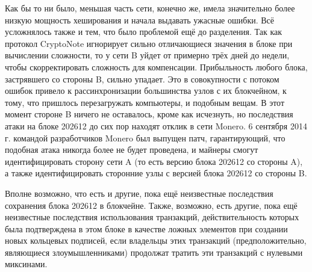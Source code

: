 \documentclass{mrl}
\begin{document}
Как бы то ни было, меньшая часть сети, конечно же, имела значительно более низкую мощность хеширования и начала выдавать ужасные ошибки. Всё усложнялось также и тем, что было проблемой ещё до разделения. Так как протокол CryptoNote игнорирует сильно отличающиеся значения в блоке при вычислении сложности, то у сети B уйдет от примерно трёх дней до недели, чтобы скорректировать сложность для компенсации. Прибыльность любого блока, застрявшего со стороны B, сильно упадает. Это в совокупности с потоком ошибок привело к рассинхронизации большинства узлов с их блокчейном, к тому, что пришлось перезагружать компьютеры, и подобным вещам. В этот момент стороне B ничего не оставалось, кроме как исчезнуть, но последствия атаки на блоке 202612 до сих пор находят отклик в сети Monero. 6 сентября 2014 г. командой разработчиков Monero был выпущен патч, гарантирующий, что подобная атака никогда более не будет проведена, и майнеры смогут идентифицировать сторону сети A (то есть версию блока 202612 со стороны A), а также идентифицировать сторонние узлы с версией блока 202612 со стороны B.

Вполне возможно, что есть и другие, пока ещё неизвестные последствия сохранения блока 202612 в блокчейне. Также, возможно, есть другие, пока ещё неизвестные последствия использования транзакций, действительность которых была подтверждена в этом блоке в качестве ложных элементов при создании новых кольцевых подписей, если владельцы этих транзакций (предположительно, являющиеся злоумышленниками) продолжат тратить эти транзакций с нулевыми миксинами.



\end{document}
